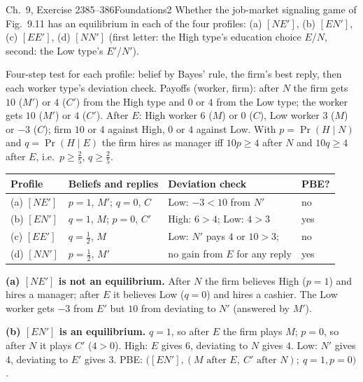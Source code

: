 \begin{exsol}{\MG{} Ch.~9, Exercise 2}{385--386}{Foundations}{2}
\asked Whether the job-market signaling game of Fig.~9.11 has an equilibrium in each of the four
profiles: (a) $[NE']$, (b) $[EN']$, (c) $[EE']$, (d) $[NN']$ (first letter: the High type's
education choice $E$/$N$, second: the Low type's $E'$/$N'$).

\method Four-step test for each profile: belief by Bayes' rule, the firm's best reply, then each
worker type's deviation check. Payoffs (worker, firm): after $N$ the firm gets $10$ ($M'$) or $4$ ($C'$)
from the High type and $0$ or $4$ from the Low type; the worker gets $10$ ($M'$) or $4$ ($C'$). After
$E$: High worker $6$ ($M$) or $0$ ($C$), Low worker $3$ ($M$) or $-3$ ($C$); firm $10$ or $4$ against
High, $0$ or $4$ against Low. With $p = \Pr(H \mid N)$ and $q = \Pr(H \mid E)$ the firm hires as
manager iff $10p \ge 4$ after $N$ and $10q \ge 4$ after $E$, i.e.\ $p \ge \frac25$, $q \ge \frac25$.

\solution
\begin{center}
\begin{tabular}{llll}
\toprule
Profile & Beliefs and replies & Deviation check & PBE? \\
\midrule
(a) $[NE']$ & $p = 1$, $M'$; $q = 0$, $C$ & Low: $-3 < 10$ from $N'$ & no \\
(b) $[EN']$ & $q = 1$, $M$; $p = 0$, $C'$ & High: $6 > 4$; Low: $4 > 3$ & yes \\
(c) $[EE']$ & $q = \frac12$, $M$ & Low: $N'$ pays $4$ or $10 > 3$; & no \\
(d) $[NN']$ & $p = \frac12$, $M'$ & no gain from $E$ for any reply & yes \\
\bottomrule
\end{tabular}
\end{center}
\textbf{(a) $[NE']$ is not an equilibrium.} After $N$ the firm believes High ($p = 1$) and hires
a manager; after $E$ it believes Low ($q = 0$) and hires a cashier. The Low worker gets $-3$ from
$E'$ but $10$ from deviating to $N'$ (answered by $M'$).

\textbf{(b) $[EN']$ is an equilibrium.} $q = 1$, so after $E$ the firm plays $M$; $p = 0$, so after $N$ it
plays $C'$ ($4 > 0$). High: $E$ gives $6$, deviating to $N$ gives $4$. Low: $N'$ gives $4$, deviating
to $E'$ gives $3$. PBE: $\bigl([EN'], (M \text{ after } E,\ C' \text{ after } N);\ q = 1, p = 0\bigr)$.


\end{exsol}
